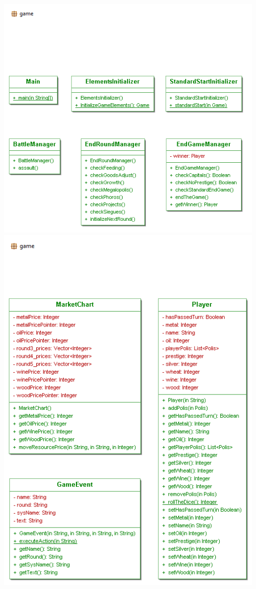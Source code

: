\documentclass[11 pt]{book}
\begin{document}
\begin{center}
		    \includegraphics[width=500px]{design-uml/iteration3/game-main-managers.png}
		    \includegraphics[width=500px]{design-uml/iteration3/game-martket-gameevent-player.png}

\end{center}
\end{document}
